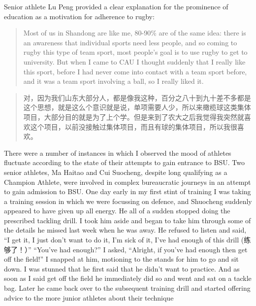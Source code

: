 \begin{CJK}{UTF8}{gbsn}
Senior athlete Lu Peng provided a clear explanation for the prominence of education as a motivation for adherence to rugby:

\begin{quotation}
  Most of us in Shandong are like me, 80-90\% are of the same idea: there is an awareness that individual sports need less people, and so coming to rugby this type of team sport, most people’s goal is to use rugby to get to university.  But when I came to CAU I thought suddenly that I really like this sport, before I had never come into contact with a team sport before, and it was a team sport involving a ball, so I really liked it.
\end{quotation}

\begin{quotation}
  对，因为我们山东大部分人，都是像我这种，百分之八十到九十差不多都是这个思想，就是这么个意识就是说，单项需要人少，所以来橄榄球这类集体项目，大部分目的就是为了上个学。但是来到了农大之后我觉得我突然就喜欢这个项目，以前没接触过集体项目，而且有球的集体项目，所以我很喜欢。
\end{quotation}


There were a number of instances in which I observed the mood of athletes fluctuate according to the state of their attempts to gain entrance to BSU.  Two senior athletes, Ma Haitao and Cui Suocheng, despite long qualifying as a Champion Athlete, were involved in complex bureaucratic journeys in an attempt to gain admission to BSU.  One day early in my first stint of training I was taking a training session in which we were focussing on defence, and Shuocheng suddenly appeared to have given up all energy.  He all of a sudden stopped doing the prescribed tackling drill.  I took him aside and began to take him through some of the details he missed last week when he was away.  He refused to listen and said, “I get it, I just don’t want to do it, I’m sick of it, I’ve had enough of this drill (练够了！）”  “You’ve had enough?” I asked, “Alright, if you’ve had enough then get off the field!”  I snapped at him, motioning to the stands for him to go and sit down. I was stunned that he first said that he didn’t want to practice.  And as soon as I said get off the field he immediately did so and went and sat on a tackle bag.  Later he came back over to the subsequent training drill and started offering advice to the more junior athletes about their technique


\end{CJK}
